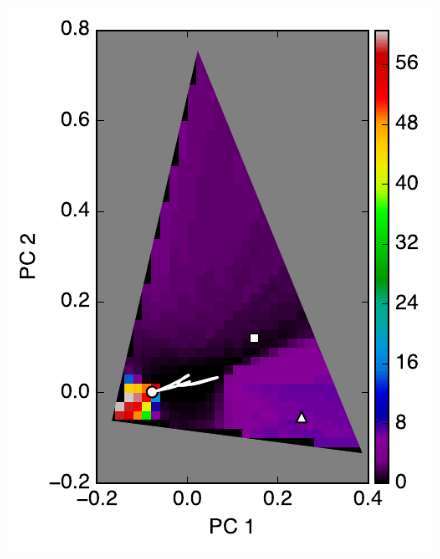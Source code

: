 \documentclass[iop,numberedappendix,apj,]{emulateapj}
\begin{document}
\begin{figure}[tbh!]
    \begin{center}
   \begin{minipage}{0.33\hsize}
\includegraphics[width=\hsize]{mockdata_90deg_3types2_t360_lc_noreg.pdf}
     \end{minipage}
   \begin{minipage}{0.33\hsize}

\end{minipage}
\end{center}
\end{figure}
\end{document}
